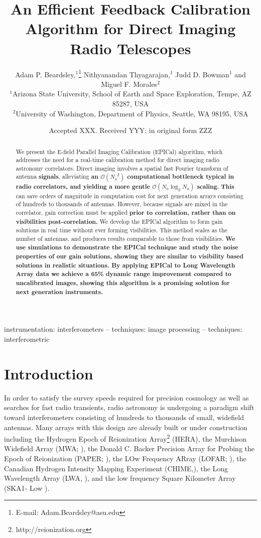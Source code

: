 \documentclass[a4paper,fleqn,usenatbib]{../mnras}
\title[EPICal]{An Efficient Feedback Calibration Algorithm for Direct Imaging Radio Telescopes
}
\author[Beardsley et al.]{
Adam P. Beardsley,$^{1}$\thanks{E-mail: Adam.Beardsley@asu.edu}
Nithyanandan Thyagarajan,$^{1}$
Judd D. Bowman$^{1}$
\newauthor
and Miguel F. Morales$^{2}$
\\
$^{1}$Arizona State University, School of Earth and Space Exploration, Tempe, AZ 85287, USA\\
$^{2}$University of Washington, Department of Physics, Seattle, WA 98195, USA\\
}
\date{Accepted XXX. Received YYY; in original form ZZZ}
\newcommand{\Nant}{\ensuremath{N_{\mathrm{a}}}}
\begin{document}
\label{firstpage}
\pagerange{\pageref{firstpage}--\pageref{lastpage}}
\maketitle

\begin{abstract}
We present the E-field Parallel Imaging Calibration (EPICal) algorithm, which addresses the 
need for a real-time calibration method for direct imaging radio astronomy correlators. Direct 
imaging involves a spatial fast Fourier transform of antenna \textbf{signals}, alleviating 
\textbf{an 
$\mathcal{O}(\Nant^2)$ computational bottleneck typical in radio correlators, and yielding a more gentle $\mathcal{O}(\Nant \log_2 
\Nant)$ scaling.} \textbf{This} can save orders of magnitude in computation cost for next generation arrays 
consisting of hundreds to thousands of antennas. However, because signals are mixed in the 
correlator, gain correction must be applied \textbf{prior to correlation, rather than on visibilities post-correlation.} We develop the EPICal algorithm 
to form gain solutions in real time without ever forming visibilities. This method scales as the 
number of antennas, and produces results comparable to those from visibilities. 
\textbf{We use simulations to demonstrate the EPICal technique and study the noise properties of
our gain solutions, showing they are similar to visibility based solutions in realistic 
situations.
By applying EPICal to Long Wavelength Array data we achieve a 65\% dynamic range
improvement compared to uncalibrated images, showing this algorithm is a promising
solution for next generation instruments.}
\end{abstract}

\begin{keywords}
instrumentation: interferometers -- techniques: image processing -- techniques: interferometric
\end{keywords}



\section{Introduction}
In order to satisfy the survey speeds required for precision cosmology as well as searches for 
fast radio transients, radio astronomy is undergoing a paradigm shift toward interferometers 
consisting of hundreds to thousands of small, widefield antennas. Many arrays with this design 
are already built or under construction including the Hydrogen Epoch of Reionization 
Array\footnote{http://reionization.org} (HERA), the Murchison Widefield Array (MWA; 
\citealt{tin13,bow13}), the Donald C. Backer Precision Array for Probing the Epoch of 
Reionization (PAPER; \citealt{par10}), the LOw Frequency ARray (LOFAR; \citealt{van13}), the 
Canadian Hydrogen Intensity Mapping Experiment (CHIME,\citealt{ban14}), the Long 
Wavelength Array (LWA, \citealt{ell13}), and the low frequency Square Kilometer Array (SKA1-
Low \citealt{mel13}).
\end{document}

